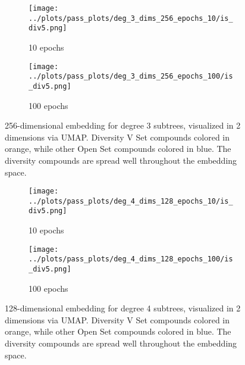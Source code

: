 \begin{figure}[h]
\begin{subfigure}{0.45\textwidth}
\centering
\texttt{[image: ../plots/pass\_plots/deg\_3\_dims\_256\_epochs\_10/is\_div5.png]}
\caption{10 epochs}
\label{fig:isdiv5deg_3_dims_256_epochs_10}
\end{subfigure}
\begin{subfigure}{0.45\textwidth}
\texttt{[image: ../plots/pass\_plots/deg\_3\_dims\_256\_epochs\_100/is\_div5.png]}
\caption{100 epochs}
\label{fig:isdiv5deg_3_dims_256_epochs_100}
\end{subfigure}
\caption{256-dimensional embedding for degree 3 subtrees, visualized in 2 dimensions via UMAP. Diversity V Set compounds colored in orange, while other Open Set compounds colored in blue. The diversity compounds are spread well throughout the embedding space.}
\end{figure}

\begin{figure}[h]
\begin{subfigure}{0.45\textwidth}
\centering
\texttt{[image: ../plots/pass\_plots/deg\_4\_dims\_128\_epochs\_10/is\_div5.png]}
\caption{10 epochs}
\label{fig:deg4_10_isdiv5}
\end{subfigure}
\begin{subfigure}{0.45\textwidth}
\texttt{[image: ../plots/pass\_plots/deg\_4\_dims\_128\_epochs\_100/is\_div5.png]}
\caption{100 epochs}
\label{fig:deg4isdiv5}
\end{subfigure}
\caption{128-dimensional embedding for degree 4 subtrees, visualized in 2 dimensions via UMAP. Diversity V Set compounds colored in orange, while other Open Set compounds colored in blue. The diversity compounds are spread well throughout the embedding space.}
\end{figure}


